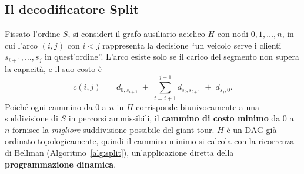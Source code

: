 \documentclass[10pt,a4paper]{article}
\begin{document}
\subsection{Il decodificatore Split}

Fissato l'ordine $S$, si consideri il grafo ausiliario aciclico $H$ con nodi
$0,1,\dots,n$, in cui l'arco $(i,j)$ con $i<j$ rappresenta la decisione ``un
veicolo serve i clienti $s_{i+1},\dots,s_j$ in quest'ordine''. L'arco esiste solo
se il carico del segmento non supera la capacità, e il suo costo è
\[
  c(i,j) \;=\; d_{0,s_{i+1}} \;+\; \sum_{t=i+1}^{j-1} d_{s_t,s_{t+1}} \;+\; d_{s_j,0}.
\]
Poiché ogni cammino da $0$ a $n$ in $H$ corrisponde biunivocamente a una
suddivisione di $S$ in percorsi ammissibili, il \textbf{cammino di costo minimo}
da $0$ a $n$ fornisce la \emph{migliore} suddivisione possibile del giant tour.
$H$ è un DAG già ordinato topologicamente, quindi il cammino minimo si calcola
con la ricorrenza di Bellman (Algoritmo~\ref{alg:split}), un'applicazione diretta
della \textbf{programmazione dinamica}.
\end{document}
